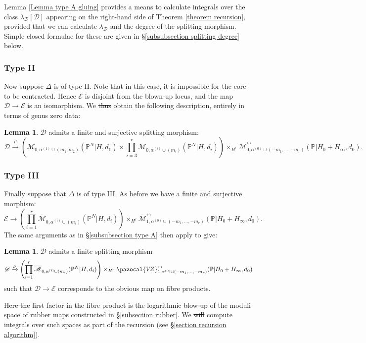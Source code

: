 \documentclass[11pt]{amsart}
\newcommand{\PP}{\mathbb P}
\newcommand{\VZ}{\pazocal{V\!Z}}
\renewcommand{\to}{\rightarrow}
\newcommand{\Mcal}{\mathcal{M}}
\newcommand{\Dcal}{\mathcal{D}}
\newcommand{\Ecal}{\mathcal{E}}
\newcommand{\ol}[1]{\overline{#1}}
\theoremstyle{definition}
\newtheorem{lemma}[thm]{Lemma}
\theoremstyle{definition}
\providecommand{\DIFaddtex}[1]{{\protect\color{blue}\uwave{#1}}} %
\providecommand{\DIFdeltex}[1]{{\protect\color{red}\sout{#1}}}                      %
\providecommand{\DIFaddbegin}{} %
\providecommand{\DIFaddend}{} %
\providecommand{\DIFdelbegin}{} %
\providecommand{\DIFdelend}{} %
\providecommand{\DIFadd}[1]{\texorpdfstring{\DIFaddtex{#1}}{#1}} %
\providecommand{\DIFdel}[1]{\texorpdfstring{\DIFdeltex{#1}}{}} %
\begin{document}
Lemma \ref{Lemma type A gluing} provides a means to calculate integrals over the class $\lambda_\Dcal[\Dcal]$ appearing on the right-hand side of Theorem \ref{theorem recursion}, provided that we can calculate $\lambda_\Dcal$ and the degree of the splitting morphism. Simple closed formulae for these are given in \S \ref{subsubsection splitting degree} below.

\subsubsection{Type II}
Now suppose $\Delta$ is of type II. \DIFdelbegin \DIFdel{Note that in }\DIFdelend \DIFaddbegin \DIFadd{In }\DIFaddend this case, it is impossible for the core to be contracted. Hence $\Ecal$ is disjoint from the blown-up locus, and the map $\Dcal \to \Ecal$ is an isomorphism. We \DIFdelbegin \DIFdel{thus }\DIFdelend obtain the following description, entirely in terms of genus zero data:
\begin{lemma} $\Dcal$ admits a finite and surjective splitting morphism:
\begin{equation*} \Dcal \xrightarrow{\rho} \left(\ol\Mcal_{0,\alpha^{(1)}\cup(m_1,m_2)}(\PP^N|H,d_1)\times\prod_{i=3}^r \ol\Mcal_{0,\alpha^{(i)}\cup(m_i)}(\PP^N|H,d_i)\right) \times_{H^r} \ol\Mcal^{\leftrightarrow}_{0,\alpha^{(0)}\cup(-m_1,\ldots,-m_r)}(\mathbb P|H_0+H_\infty,d_0).\end{equation*}\end{lemma}

\subsubsection{Type III} \label{subsubsection type C+} Finally suppose that $\Delta$ is of type III. As before we have a finite and surjective morphism:
\begin{equation*} \Ecal \to  \left( \prod_{i=1}^r \ol\Mcal_{0,\alpha^{(i)}\cup(m_i)}(\PP^N|H,d_i) \right) \times_{H^r} \ol\Mcal^{\leftrightarrow}_{1,\alpha^{(0)}\cup(-m_1,\ldots,-m_r)}(\mathbb{P}|H_0+H_\infty,d_0). \end{equation*}
The same arguments as in \S \ref{subsubsection type A} then apply to give:
\begin{lemma} $\Dcal$ admits a finite splitting morphism
\begin{equation*}\Dcal \xrightarrow{\rho} \left( \prod_{i=1}^r \ol\Mcal_{0,\alpha^{(i)}\cup(m_i)}(\PP^N|H,d_i) \right) \times_{H^r} \VZ^{\leftrightarrow}_{1,\alpha^{(0)}\cup(-m_1,\ldots,-m_r)}(\mathbb{P}|H_0+H_\infty,d_0)\end{equation*}
such that $\Dcal \to \Ecal$ corresponds to the obvious map on fibre products.\end{lemma}
\DIFdelbegin \DIFdel{Here the }\DIFdelend \DIFaddbegin \DIFadd{The }\DIFaddend first factor in the fibre product is the logarithmic \DIFdelbegin \DIFdel{blow-up }\DIFdelend \DIFaddbegin \DIFadd{blowup }\DIFaddend of the moduli space of rubber maps constructed in \S \ref{subsection rubber}. We \DIFdelbegin \DIFdel{will }\DIFdelend compute integrals over such spaces as part of the recursion (see \S \ref{section recursion algorithm}).
\end{document}

